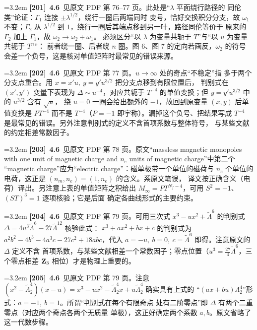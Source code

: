 \par
\par\medskip\noindent\hangindent=3.2em \textbf{[201]}~\textbf{4.6}~见原文 PDF 第 76--77 页。此处是“$\lambda$ 平面绕行路径的 同伦类”论证：$\Gamma_1$ 连接 $\pm\lambda^{1/2}$，绕行一圈后两端同时 变号，恰好交换积分分支，故 $\omega_1$ 不变；$\Gamma_2$ 从 $\lambda^{1/2}$ 到 $1$，绕行一圈后其端点移到另一叶，路径同伦等价于 原来的 $\Gamma_2$ 加上 $\Gamma_1$，故 $\omega_2\to\omega_2+\omega_1$。 必须区分“以 $\lambda$ 为变量共轭于 $T$”与“以 $u$ 为变量共轭于 $T^n$”： 前者绕一圈、后者绕 $n$ 圈。图 6、图 7 的定向若画反，$\omega_2$ 的符号 会差一个负号，这是核对单值矩阵时最常见的错误来源。
\par
\par\medskip\noindent\hangindent=3.2em \textbf{[202]}~\textbf{4.6}~见原文 PDF 第 77 页。$u\to\infty$ 处的奇点“不稳定”指 多于两个分支点重合。用 $x=x'u,\ y=y'u^{3/2}$ 把分支点移到有限位置后， 判别式在 $(x',y')$ 变量下表现为 $\Delta\sim u^{-4}$，对应共轭于 $T^{-4}$ 的单值变换；但 $y=y'u^{3/2}$ 中的 $u^{3/2}$ 含有 $\sqrt u$， 绕 $u=0$ 一圈会给出额外的 $-1$，故回到原变量 $(x,y)$ 后单值变换是 $PT^{-4}$ 而不是 $T^{-4}$（$P=-1$ 即宇称）。漏掉这个负号、把结果写成 $T^{-4}$ 是最常见的错误。另外注意判别式的定义不含首项系数与整体符号， 与某些文献的约定相差常数因子。
\par
\par\medskip\noindent\hangindent=3.2em \textbf{[203]}~\textbf{4.6}~见原文 PDF 第 78 页。原文“massless magnetic monopoles with one unit of magnetic charge and $n_e$ units of magnetic charge”中第二个 “magnetic charge”应为“electric charge”：磁单极带一个单位的磁荷与 $n_e$ 个单位的电荷，这正是 $(n_m,n_e)=(1,n_e)$ 的含义。系原文笔误， 译文按正确含义（电荷）译出。另注意上表的单值矩阵之积给出 $M_\infty=PT^{N_f-4}$，可用 $S^2=-1$、$(ST)^3=1$ 逐项核验；它是后面 确定各曲线形式的主要约束。
\par
\par\medskip\noindent\hangindent=3.2em \textbf{[204]}~\textbf{4.6}~见原文 PDF 第 79 页。可用三次式 $x^3-ux^2+\tilde\Lambda^6$ 的判别式 $\Delta=4u^3\tilde\Lambda^6-27\tilde\Lambda^{12}$ 核验此式： $x^3+ax^2+bx+c$ 的判别式为 $a^2b^2-4b^3-4a^3c-27c^2+18abc$，代入 $a=-u,\ b=0,\ c=\tilde\Lambda^6$ 即得。注意原文的 $\Delta$ 定义不含 首项系数，与某些文献相差一个常数因子；零点位置（$u^3=\frac{27}{4} \tilde\Lambda^6$，三个零点相差 ${\bf Z}_3$ 相位）才是物理上重要的。
\par
\par\medskip\noindent\hangindent=3.2em \textbf{[205]}~\textbf{4.6}~见原文 PDF 第 79 页。注意 $(x^2-\tilde\Lambda_2^4)(x-u) = x^3-ux^2-\tilde\Lambda_2^4x+u\tilde\Lambda_2^4$ 确实具有上式的 “$(ax+bu)\Lambda_2^4$”形式：$a=-1,\ b=1$。所谓“判别式在每个有限奇点 处有二阶零点”即 $\Delta$ 有两个二重零点（对应两个奇点各两个无质量 单极），这正好确定两个系数 $a,b$。原文省略了这一代数步骤。
